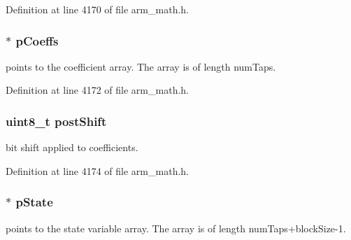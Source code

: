 Definition at line 4170 of file arm\+\_\+math.\+h.

\subsubsection[{\texorpdfstring{p\+Coeffs}{pCoeffs}}]{$\ast$ p\+Coeffs}\hypertarget{structarm__lms__norm__instance__q31_a68888e36167d81cb7836db10367a1682}{}\label{structarm__lms__norm__instance__q31_a68888e36167d81cb7836db10367a1682}
points to the coefficient array. The array is of length num\+Taps. 

Definition at line 4172 of file arm\+\_\+math.\+h.

\subsubsection[{\texorpdfstring{post\+Shift}{postShift}}]{\setlength{\rightskip}{0pt plus 5cm}uint8\+\_\+t post\+Shift}\hypertarget{structarm__lms__norm__instance__q31_a74050e9f36542bd56f4052381a82ae8f}{}\label{structarm__lms__norm__instance__q31_a74050e9f36542bd56f4052381a82ae8f}
bit shift applied to coefficients. 

Definition at line 4174 of file arm\+\_\+math.\+h.

\subsubsection[{\texorpdfstring{p\+State}{pState}}]{$\ast$ p\+State}\hypertarget{structarm__lms__norm__instance__q31_adee4ba3ee8869865af7d8fa08ca913d6}{}\label{structarm__lms__norm__instance__q31_adee4ba3ee8869865af7d8fa08ca913d6}
points to the state variable array. The array is of length num\+Taps+block\+Size-\/1. 

